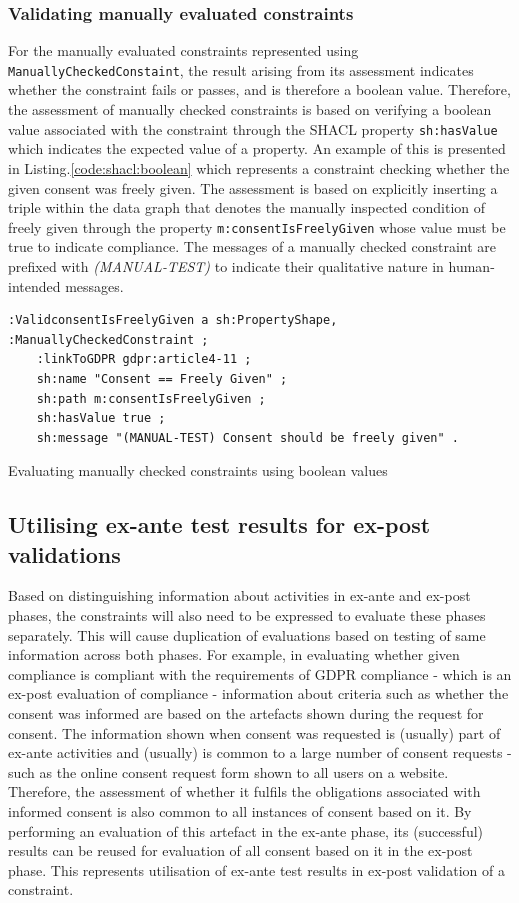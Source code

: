 \subsubsection{Validating manually evaluated constraints}
For the manually evaluated constraints represented using \texttt{ManuallyCheckedConstaint}, the result arising from its assessment indicates whether the constraint fails or passes, and is therefore a boolean value.
Therefore, the assessment of manually checked constraints is based on verifying a boolean value associated with the constraint through the SHACL property \texttt{sh:hasValue} which indicates the expected value of a property.
An example of this is presented in Listing.\autoref{code:shacl:boolean} which represents a constraint checking whether the given consent was freely given.
The assessment is based on explicitly inserting a triple within the data graph that denotes the manually inspected condition of freely given through the property \texttt{m:consentIsFreelyGiven} whose value must be true to indicate compliance.
The messages of a manually checked constraint are prefixed with \textit{(MANUAL-TEST)} to indicate their qualitative nature in human-intended messages.
\begin{listing}[htbp]
\begin{verbatim}
:ValidconsentIsFreelyGiven a sh:PropertyShape, :ManuallyCheckedConstraint ;
    :linkToGDPR gdpr:article4-11 ;
    sh:name "Consent == Freely Given" ;
    sh:path m:consentIsFreelyGiven ;
    sh:hasValue true ;
    sh:message "(MANUAL-TEST) Consent should be freely given" .
\end{verbatim}
\caption{Evaluating manually checked constraints using boolean values}
\label{code:shacl:boolean}
\end{listing}

\subsection{Utilising ex-ante test results for ex-post validations}\label{sec:testing:shacl:combine}
Based on distinguishing information about activities in ex-ante and ex-post phases, the constraints will also need to be expressed to evaluate these phases separately.
This will cause duplication of evaluations based on testing of same information across both phases. 
For example, in evaluating whether given compliance is compliant with the requirements of GDPR compliance - which is an ex-post evaluation of compliance - information about criteria such as whether the consent was informed are based on the artefacts shown during the request for consent. The information shown when consent was requested is (usually) part of ex-ante activities and (usually) is common to a large number of consent requests - such as the online consent request form shown to all users on a website. Therefore, the assessment of whether it fulfils the obligations associated with informed consent is also common to all instances of consent based on it. 
By performing an evaluation of this artefact in the ex-ante phase, its (successful) results can be reused for evaluation of all consent based on it in the ex-post phase.
This represents utilisation of ex-ante test results in ex-post validation of a constraint.


